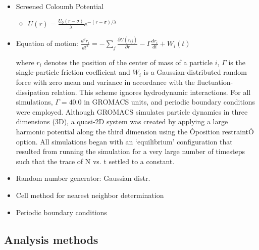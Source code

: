 \documentclass{umthesis}          %
\begin{document}
\begin{itemize}

\item Screened Coloumb Potential\\
\label{sec-3.2.2.1}

\begin{itemize}

\item $U(r)=\frac{U_0 (r-\sigma)}{\lambda} e^{-(r-\sigma)/\lambda}$\\
\label{sec-3.2.2.1.1}

\end{itemize} %

\item Equation of motion: $\frac{d^2 r_i}{dt^2}  = - \sum_j \frac{\partial{U(r_{ij})}}{{\partial r}}  - \Gamma  \frac{d r_i}{dt} + W_i (t)$\\
\label{sec-3.2.2.2}

where $r_i$ denotes the position of the center of mass of a particle $i$, $\Gamma$ is the single-particle friction coefficient and $W_i$ is a Gaussian-distributed random force with zero mean and variance in accordance with the fluctuation-dissipation relation.  This scheme ignores hydrodynamic interactions. For all simulations, $\Gamma=40.0$ in GROMACS units, and periodic boundary conditions were employed. Although GROMACS simulates particle dynamics in three dimensions (3D), a quasi-2D system was created by applying a large harmonic potential along the third dimension using the Òposition restraintÓ option. All simulations began with an `equilibrium' configuration that resulted from running the simulation for a very large number of timesteps such that the trace of N vs. t settled to a constant.

\item Random number generator: Gaussian distr.\\
\label{sec-3.2.2.3}


\item Cell method for nearest neighbor determination\\
\label{sec-3.2.2.4}


\item Periodic boundary conditions\\
\label{sec-3.2.2.5}

\end{itemize} %
\subsection{Analysis methods}
\label{sec-3.2.3}
\end{document}
